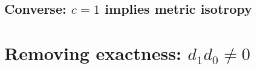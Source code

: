 \documentclass[preprint,12pt]{elsarticle}
\begin{document}
\subsection{Converse: $c = 1$ implies metric isotropy}
\label{sec:converse}

%
%
%
%
%
%
%


\section{Removing exactness: $d_1 d_0 \neq 0$}
\label{sec:exactness}
\end{document}

